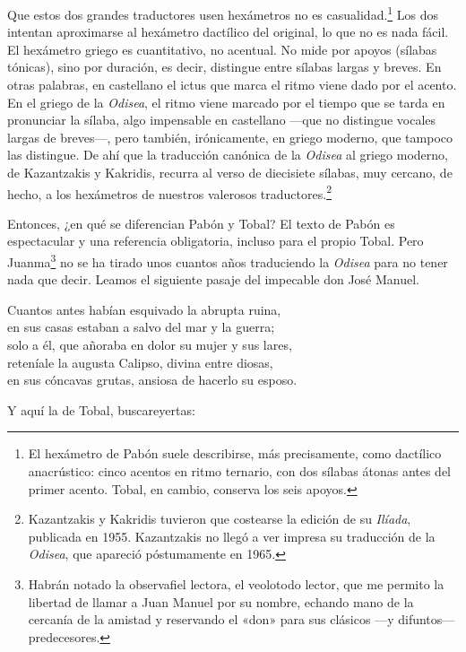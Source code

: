 Que estos dos grandes traductores usen hexámetros no es casualidad.\footnote{El hexámetro de Pabón suele describirse, más precisamente, como dactílico anacrústico: cinco acentos en ritmo ternario, con dos sílabas átonas antes del primer acento. Tobal, en cambio, conserva los seis apoyos.} Los dos intentan aproximarse al hexámetro dactílico del original, lo que no es nada fácil. El hexámetro griego es cuantitativo, no acentual. No mide por apoyos (sílabas tónicas), sino por duración, es decir, distingue entre sílabas largas y breves. En otras palabras, en castellano el ictus que marca el ritmo viene dado por el acento. En el griego de la \emph{Odisea}, el ritmo viene marcado por el tiempo que se tarda en pronunciar la sílaba, algo impensable en castellano ---que no distingue vocales largas de breves---, pero también, irónicamente, en griego moderno, que tampoco las distingue. De ahí que la traducción canónica de la \emph{Odisea} al griego moderno, de Kazantzakis y Kakridis, recurra al verso de diecisiete sílabas, muy cercano, de hecho, a los hexámetros de nuestros valerosos traductores.\footnote{Kazantzakis y Kakridis tuvieron que costearse la edición de su \emph{Ilíada}, publicada en 1955. Kazantzakis no llegó a ver impresa su traducción de la \emph{Odisea}, que apareció póstumamente en 1965.}

Entonces, ¿en qué se diferencian Pabón y Tobal?
El texto de Pabón es espectacular y una referencia obligatoria, incluso para el propio Tobal. Pero Juanma\footnote{Habrán notado la observafiel lectora, el veolotodo lector, que me permito la libertad de llamar a Juan Manuel por su nombre, echando mano de la cercanía de la amistad y reservando el «don» para sus clásicos ---y difuntos--- predecesores.} no se ha tirado unos cuantos años traduciendo la \emph{Odisea} para no tener nada que decir. Leamos el siguiente pasaje del impecable don José Manuel.

\begin{versocita}
Cuantos antes habían esquivado la abrupta ruina,\\
en sus casas estaban a salvo del mar y la guerra;\\
solo a él, que añoraba en dolor su mujer y sus lares,\\
reteníale la augusta Calipso, divina entre diosas,\\
en sus cóncavas grutas, ansiosa de hacerlo su esposo.
\end{versocita}

Y aquí la de Tobal, buscareyertas:

